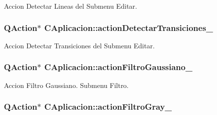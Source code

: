 Accion Detectar Lineas del Submenu Editar. 

\subsubsection[{\texorpdfstring{action\+Detectar\+Transiciones\+\_\+}{actionDetectarTransiciones_}}]{\setlength{\rightskip}{0pt plus 5cm}Q\+Action$\ast$ C\+Aplicacion\+::action\+Detectar\+Transiciones\+\_\+\hspace{0.3cm}{\ttfamily [private]}}\hypertarget{classCAplicacion_acda82e41d91a94e32bbfa21965338f5a}{}\label{classCAplicacion_acda82e41d91a94e32bbfa21965338f5a}


Accion Detectar Transiciones del Submenu Editar. 

\subsubsection[{\texorpdfstring{action\+Filtro\+Gaussiano\+\_\+}{actionFiltroGaussiano_}}]{\setlength{\rightskip}{0pt plus 5cm}Q\+Action$\ast$ C\+Aplicacion\+::action\+Filtro\+Gaussiano\+\_\+\hspace{0.3cm}{\ttfamily [private]}}\hypertarget{classCAplicacion_ae6827414fe74e31b2216ec04f61ad21f}{}\label{classCAplicacion_ae6827414fe74e31b2216ec04f61ad21f}


Accion Filtro Gaussiano. Submenu Filtro. 

\subsubsection[{\texorpdfstring{action\+Filtro\+Gray\+\_\+}{actionFiltroGray_}}]{\setlength{\rightskip}{0pt plus 5cm}Q\+Action$\ast$ C\+Aplicacion\+::action\+Filtro\+Gray\+\_\+\hspace{0.3cm}{\ttfamily [private]}}\hypertarget{classCAplicacion_a62326cfe231c222d4d3411b4f9a5fc81}{}\label{classCAplicacion_a62326cfe231c222d4d3411b4f9a5fc81}



